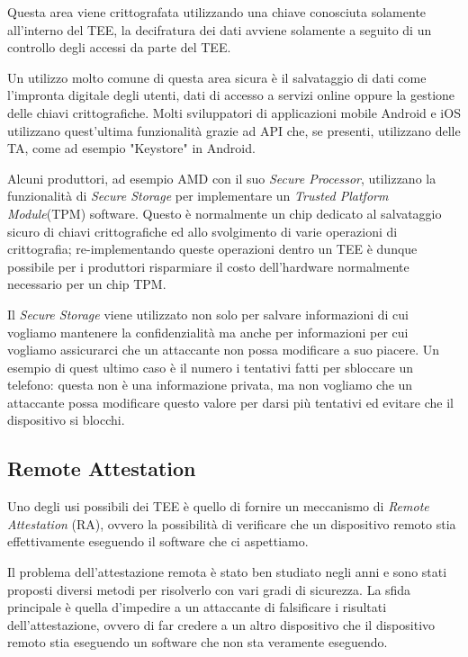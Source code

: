 \documentclass[12pt,italian]{report}
\begin{document}
Questa area viene crittografata utilizzando una chiave conosciuta solamente
all'interno del TEE, la decifratura dei dati avviene solamente a seguito di
un controllo degli accessi da parte del TEE.

Un utilizzo molto comune di questa area sicura è il salvataggio di dati
come l'impronta digitale degli utenti, dati di accesso a servizi online
oppure la gestione delle chiavi crittografiche.
Molti sviluppatori di applicazioni mobile Android e iOS utilizzano
quest'ultima funzionalità grazie ad API che, se presenti, utilizzano delle
TA, come ad esempio "Keystore"\cite{androidkeystore} in Android.

Alcuni produttori, ad esempio AMD con il suo
\textit{Secure Processor}, utilizzano la
funzionalità di \textit{Secure Storage} per implementare un
\textit{Trusted Platform Module}(TPM) software\cite{amd2020ftpm}.
Questo è normalmente un chip dedicato al salvataggio sicuro di chiavi crittografiche
ed allo svolgimento di varie operazioni di crittografia; re-implementando
queste operazioni dentro un TEE è dunque possibile per i produttori risparmiare
il costo dell'hardware normalmente necessario per un chip TPM.

Il \textit{Secure Storage} viene utilizzato non solo per salvare
informazioni di cui vogliamo mantenere la confidenzialità ma anche per
informazioni per cui vogliamo assicurarci che un attaccante non possa
modificare a suo piacere.
Un esempio di quest ultimo caso è il numero i tentativi fatti per sbloccare
un telefono: questa non è una informazione privata, ma non vogliamo che un
attaccante possa modificare questo valore per darsi più tentativi ed evitare
che il dispositivo si blocchi.


\subsection{Remote Attestation}
\label{subsec:remote-attestation}
Uno degli usi possibili dei TEE è quello di fornire un meccanismo di
\textit{Remote Attestation} (RA), ovvero la possibilità di verificare che
un dispositivo remoto stia effettivamente eseguendo il software che
ci aspettiamo.

Il problema dell'attestazione remota è stato ben studiato negli anni e
sono stati proposti diversi metodi per risolverlo con vari gradi di
sicurezza.
La sfida principale è quella d'impedire a un attaccante di falsificare
i risultati dell'attestazione, ovvero di far credere a un altro dispositivo
che il dispositivo remoto stia eseguendo un software che non sta veramente
eseguendo.
\end{document}
